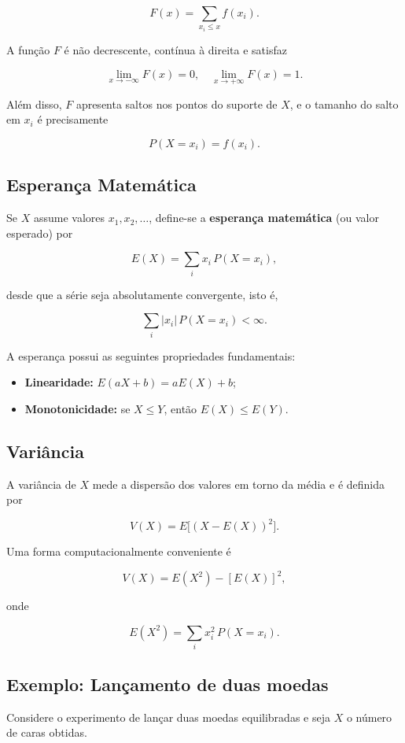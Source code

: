 \[
F(x)=\sum_{x_i \le x} f(x_i).
\]

A função $F$ é não decrescente, contínua à direita e satisfaz

\[
\lim_{x\to -\infty}F(x)=0,
\quad
\lim_{x\to +\infty}F(x)=1.
\]

Além disso, $F$ apresenta saltos nos pontos do suporte de $X$, e o tamanho do salto em $x_i$ é precisamente

\[
P(X=x_i)=f(x_i).
\]

\subsection{Esperança Matemática}

Se $X$ assume valores $x_1,x_2,\dots$, define-se a
\textbf{esperança matemática} (ou valor esperado) por

\[
E(X)=\sum_i x_i\,P(X=x_i),
\]

desde que a série seja absolutamente convergente, isto é,

\[
\sum_i |x_i|\,P(X=x_i) < \infty.
\]

A esperança possui as seguintes propriedades fundamentais:

\begin{itemize}
\item \textbf{Linearidade:} $E(aX+b)=aE(X)+b$;
\item \textbf{Monotonicidade:} se $X \le Y$, então $E(X)\le E(Y)$.
\end{itemize}

\subsection{Variância}

A variância de $X$ mede a dispersão dos valores em torno da média e é definida por

\[
V(X)=E\big[(X-E(X))^2\big].
\]

Uma forma computacionalmente conveniente é

\[
V(X)=E(X^2)-[E(X)]^2,
\]

onde

\[
E(X^2)=\sum_i x_i^2\,P(X=x_i).
\]

\newpage
\subsection{Exemplo: Lançamento de duas moedas}

Considere o experimento de lançar duas moedas equilibradas e seja
$X$ o número de caras obtidas.

